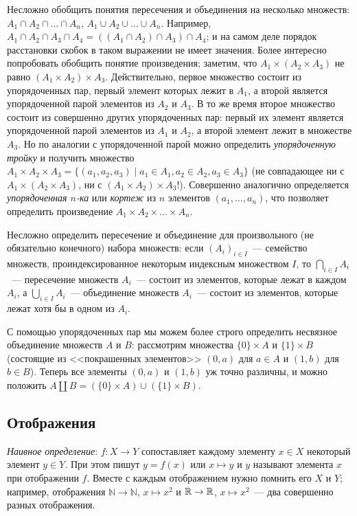 Несложно обобщить понятия пересечения и объединения на несколько
множеств: $A_1\cap A_2\cap\dots\cap A_n$, $A_1\cup A_2\cup\dots\cup
A_n$. Например, $A_1\cap A_2\cap A_3\cap A_4=((A_1\cap A_2)\cap
A_3)\cap A_4$; и на самом деле порядок расстановки скобок в таком
выражении не имеет значения. Более интересно попробовать обобщить
понятие произведения; заметим, что $A_1\times (A_2\times A_3)$ не
равно $(A_1\times A_2)\times A_3$. Действительно, первое множество
состоит из упорядоченных пар, первый элемент которых лежит в $A_1$, а
второй является упорядоченной парой элементов из $A_2$ и $A_3$. В то
же время второе множество состоит из совершенно других упорядоченных
пар: первый их элемент является упорядоченной парой элементов из $A_1$
и $A_2$, а второй элемент лежит в множестве $A_3$. Но по аналогии с
упорядоченной парой можно определить {\it упорядоченную тройку} и
получить множество $A_1\times A_2\times A_3=\{(a_1,a_2,a_3)\mid a_1\in
A_1,a_2\in A_2,a_3\in A_3\}$ (не совпадающее ни с $A_1\times(A_2\times
A_3)$, ни с $(A_1\times A_2)\times A_3$!). Совершенно аналогично
определяется {\it упорядоченная $n$-ка} или {\it кортеж} из $n$
элементов $(a_1,\dots,a_n)$, что позволяет определить произведение
$A_1\times A_2\times\dots\times A_n$.

Несложно определить пересечение и объединение для произвольного (не
обязательно конечного) набора множеств: если $(A_i)_{i\in I}$~---
семейство множеств, проиндексированное некоторым индексным множеством
$I$, то $\bigcap_{i\in I}A_i$~--- пересечение множеств $A_i$~---
состоит из элементов, которые лежат в каждом $A_i$, а $\bigcup_{i\in
  I}A_i$~--- объединение множеств $A_i$~--- состоит из элементов,
которые лежат хотя бы в одном из $A_i$.

С помощью упорядоченных пар
мы можем более строго определить несвязное объединение множеств
$A$ и $B$: рассмотрим множества $\{0\}\times A$ и $\{1\}\times B$
(состоящие из <<покрашенных элементов>> $(0,a)$ для $a\in A$ и $(1,b)$
для $b\in B$). Теперь все элементы $(0,a)$ и $(1,b)$ уж точно
различны, и можно положить $A\coprod B=(\{0\}\times A)\cup(\{1\}\times
B)$.

\subsection{Отображения}


{\em Наивное определение}: 
$f\colon X\to Y$
сопоставляет
каждому элементу $x\in X$ некоторый элемент $y\in Y$. При этом пишут
$y=f(x)$ или $x\mapsto y$ и $y$ называют 
элемента $x$ при отображении
$f$. Вместе с каждым отображением нужно помнить его
 $X$ и
 $Y$; например,
отображения
$\mathbb N\to\mathbb N$, $x\mapsto x^2$ и $\mathbb R\to\mathbb R$, $x\mapsto
x^2$~--- два совершенно разных отображения.

